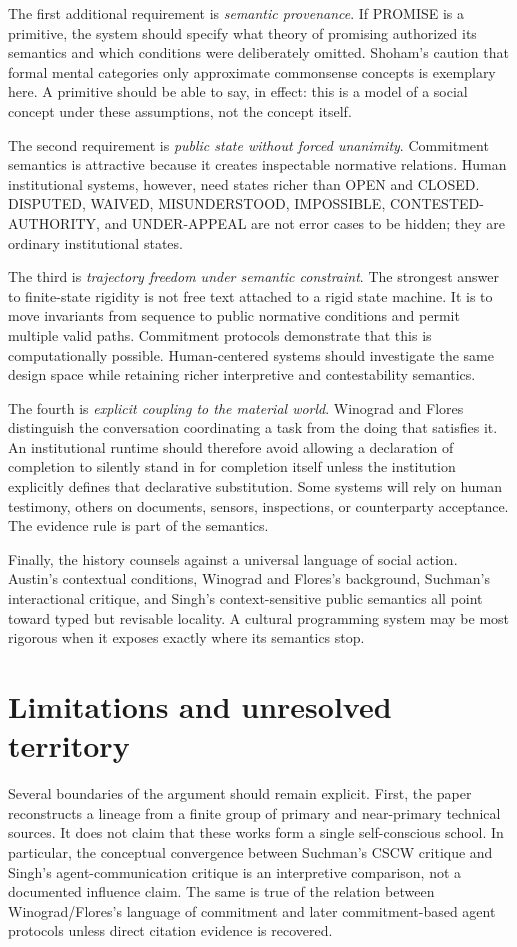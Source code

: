\documentclass[11pt]{article}
\begin{document}
The first additional requirement is \emph{semantic provenance}. If PROMISE is a primitive, the system should specify what theory of promising authorized its semantics and which conditions were deliberately omitted. Shoham's caution that formal mental categories only approximate commonsense concepts is exemplary here. A primitive should be able to say, in effect: this is a model of a social concept under these assumptions, not the concept itself. \cite{shoham1993aop}

The second requirement is \emph{public state without forced unanimity}. Commitment semantics is attractive because it creates inspectable normative relations. Human institutional systems, however, need states richer than OPEN and CLOSED. DISPUTED, WAIVED, MISUNDERSTOOD, IMPOSSIBLE, CONTESTED-AUTHORITY, and UNDER-APPEAL are not error cases to be hidden; they are ordinary institutional states.

The third is \emph{trajectory freedom under semantic constraint}. The strongest answer to finite-state rigidity is not free text attached to a rigid state machine. It is to move invariants from sequence to public normative conditions and permit multiple valid paths. Commitment protocols demonstrate that this is computationally possible. Human-centered systems should investigate the same design space while retaining richer interpretive and contestability semantics. \cite{yolumsingh2002flexible}

The fourth is \emph{explicit coupling to the material world}. Winograd and Flores distinguish the conversation coordinating a task from the doing that satisfies it. An institutional runtime should therefore avoid allowing a declaration of completion to silently stand in for completion itself unless the institution explicitly defines that declarative substitution. Some systems will rely on human testimony, others on documents, sensors, inspections, or counterparty acceptance. The evidence rule is part of the semantics.

Finally, the history counsels against a universal language of social action. Austin's contextual conditions, Winograd and Flores's background, Suchman's interactional critique, and Singh's context-sensitive public semantics all point toward typed but revisable locality. A cultural programming system may be most rigorous when it exposes exactly where its semantics stop.

\section{Limitations and unresolved territory}
Several boundaries of the argument should remain explicit. First, the paper reconstructs a lineage from a finite group of primary and near-primary technical sources. It does not claim that these works form a single self-conscious school. In particular, the conceptual convergence between Suchman's CSCW critique and Singh's agent-communication critique is an interpretive comparison, not a documented influence claim. The same is true of the relation between Winograd/Flores's language of commitment and later commitment-based agent protocols unless direct citation evidence is recovered.
\end{document}
